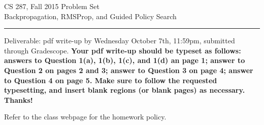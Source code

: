 \documentclass{article}
\newcommand{\ruleskip}{\bigskip\hrule\bigskip}
\begin{document}
\pagestyle{myheadings} 




{\huge
\noindent CS 287, Fall 2015
Problem Set \\
 Backpropagation, RMSProp, and Guided Policy Search}


\ruleskip
Deliverable:  pdf write-up by Wednesday October 7th, 11:59pm,
submitted through Gradescope.   {\bf Your pdf write-up should be
  typeset as follows: answers to Question 1(a), 1(b), 1(c), and 1(d)
  an page 1; answer to Question 2 on pages 2 and 3;  answer to
  Question 3 on page 4; answer to Question 4 on page 5.   Make sure to
  follow the requested typesetting, and insert blank regions (or blank pages) as necessary.  Thanks!}









\vspace{.07in} Refer to the class webpage for the
homework policy.

\end{document}
